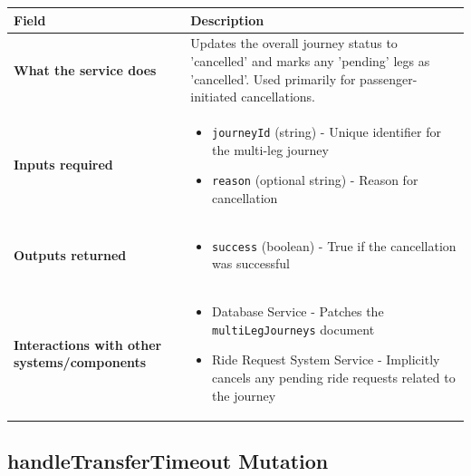 \documentclass[11pt,a4paper]{article}
\begin{document}
\begin{longtable}{|p{4cm}|p{12cm}|}
\hline
\textbf{Field} & \textbf{Description} \\
\hline
\textbf{What the service does} & 
Updates the overall journey status to 'cancelled' and marks any 'pending' legs as 'cancelled'. Used primarily for passenger-initiated cancellations. \\
\hline
\textbf{Inputs required} & 
\begin{itemize}[nosep]
\item \texttt{journeyId} (string) - Unique identifier for the multi-leg journey
\item \texttt{reason} (optional string) - Reason for cancellation
\end{itemize} \\
\hline
\textbf{Outputs returned} & 
\begin{itemize}[nosep]
\item \texttt{success} (boolean) - True if the cancellation was successful
\end{itemize} \\
\hline
\textbf{Interactions with other systems/components} & 
\begin{itemize}[nosep]
\item Database Service - Patches the \texttt{multiLegJourneys} document
\item Ride Request System Service - Implicitly cancels any pending ride requests related to the journey
\end{itemize} \\
\hline
\end{longtable}

\subsection{handleTransferTimeout Mutation}
\end{document}
